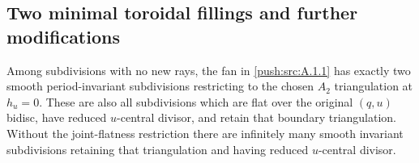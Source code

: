\subsection{Two minimal toroidal fillings and further modifications}\label{push:section:A.2}

\begin{proposition}\label{push:src:A.2.1}\label{push:A21}
Among subdivisions with no new rays, the fan in \ref{push:src:A.1.1} has exactly
two smooth period-invariant subdivisions restricting to the chosen
$A_2$ triangulation at $h_u=0$. These are also all subdivisions
which are flat over the original $(q,u)$ bidisc, have reduced
$u$-central divisor, and retain that boundary triangulation.
Without the joint-flatness restriction there are infinitely many
smooth invariant subdivisions retaining that triangulation and
having reduced $u$-central divisor.
\end{proposition}

